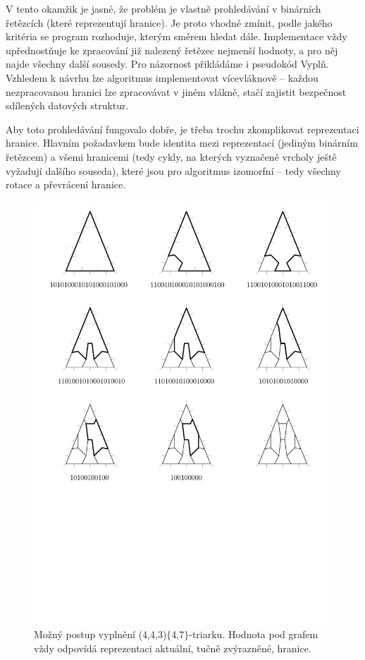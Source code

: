 V tento okamžik je jasné, že problém je vlastně prohledávání v binárních řetězcích (které reprezentují hranice). Je proto vhodné zmínit, podle jakého kritéria se program rozhoduje, kterým směrem hledat dále. Implementace vždy upřednostňuje ke zpracování již nalezený řetězec nejmenší hodnoty, a pro něj najde všechny další sousedy. Pro názornost přikládáme i pseudokód Vyplň. Vzhledem k návrhu lze algoritmus implementovat vícevláknově -- každou nezpracovanou hranici lze zpracovávat v jiném vlákně, stačí zajistit bezpečnost sdílených datových struktur.

Aby toto prohledávání fungovalo dobře, je třeba trochu zkomplikovat reprezentaci hranice. Hlavním požadavkem bude identita mezi reprezentací (jediným binárním řetězcem) a všemi hranicemi (tedy cykly, na kterých vyznačené vrcholy ještě vyžadují dalšího souseda), které jsou pro algoritmus izomorfní -- tedy všechny rotace a převrácení hranice.


\begin{figure}[h!]\centering
\includegraphics[width=\textwidth]{../img/reseni}
\caption{Možný postup vyplnění (4,4,3)$\lbrace$4,7$\rbrace$-triarku. Hodnota pod grafem vždy odpovídá reprezentaci aktuální, tučně zvýrazněné, hranice.}
\label{obr03:reseni}
\end{figure}

